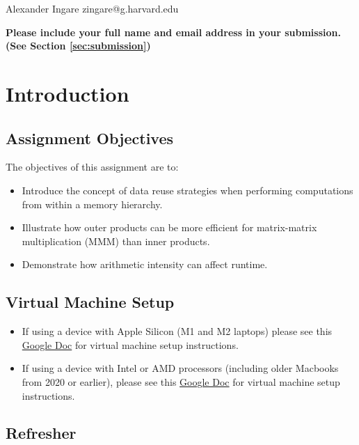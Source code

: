 \documentclass[a4 paper]{article}
\begin{document}
{ %
Alexander Ingare
zingare@g.harvard.edu
}
{}{}

\begin{center}
\textbf{Please include your full name and email address in your submission.
(See Section \ref{sec:submission})
}    
\end{center}

\section*{Introduction}
\subsection*{Assignment Objectives}
The objectives of this assignment are to:
\begin{itemize}
    \item Introduce the concept of data reuse strategies when performing computations from within a memory hierarchy. 
    \item Illustrate how outer products can be more efficient for matrix-matrix multiplication (MMM) than inner products.
    \item Demonstrate how arithmetic intensity can affect runtime. 
\end{itemize}


\subsection*{Virtual Machine Setup}
\begin{itemize}
\item If using a device with Apple Silicon (M1 and M2 laptops) please see this 
\href{https://docs.google.com/document/d/1xWgQsQKmSuJR5kxzT_85huf9Bf4HRi94qkcdeuMydJw/edit}{Google Doc} 
for virtual machine setup instructions.

\item If using a device with Intel or AMD processors (including older Macbooks from 2020 or earlier), please see this
\href{https://docs.google.com/document/d/1g_JU17qZ06vynSV1yvXgBf32fLaRqTArZO213JJtejg/edit}{Google Doc}
for virtual machine setup instructions.

\end{itemize}

\subsection*{Refresher}
\end{document}
